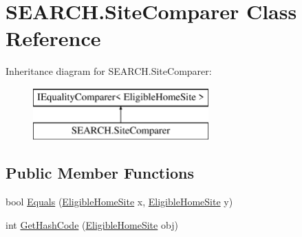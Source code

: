 \hypertarget{class_s_e_a_r_c_h_1_1_site_comparer}{\section{S\-E\-A\-R\-C\-H.\-Site\-Comparer Class Reference}
\label{class_s_e_a_r_c_h_1_1_site_comparer}
}
Inheritance diagram for S\-E\-A\-R\-C\-H.\-Site\-Comparer\-:\begin{figure}[H]
\begin{center}
\leavevmode
\includegraphics[height=2.000000cm]{class_s_e_a_r_c_h_1_1_site_comparer}
\end{center}
\end{figure}
\subsection*{Public Member Functions}
\begin{DoxyCompactItemize}
\item 
bool \hyperlink{class_s_e_a_r_c_h_1_1_site_comparer_a49775f035bf0e63bc85879bb21914e4d}{Equals} (\hyperlink{class_s_e_a_r_c_h_1_1_eligible_home_site}{Eligible\-Home\-Site} x, \hyperlink{class_s_e_a_r_c_h_1_1_eligible_home_site}{Eligible\-Home\-Site} y)
\item 
int \hyperlink{class_s_e_a_r_c_h_1_1_site_comparer_addc6d3810613eec71971cff161a3338e}{Get\-Hash\-Code} (\hyperlink{class_s_e_a_r_c_h_1_1_eligible_home_site}{Eligible\-Home\-Site} obj)
\end{DoxyCompactItemize}


